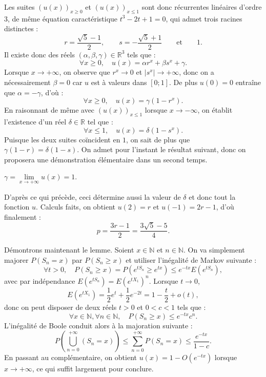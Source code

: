 Les suites $(u(x))_{x \geq 0}$ et $(u(x))_{x \leq 1}$ sont donc récurrentes linéaires d'ordre $3$, de même équation caractéristique
$t^3 - 2t + 1 = 0$, qui admet trois racines distinctes :
\[
r = \frac{\sqrt 5 - 1}{2},
\qquad
s = - \frac{\sqrt 5 + 1}{2}
\qquad\text{et}\qquad
1.
\]
Il existe donc des réels $(\alpha,\beta,\gamma) \in \mathbb R^3$ tels que :
$$
\forall x\geq 0,\quad
u(x) = \alpha r^x + \beta s^x + \gamma.
$$
Lorsque $x \to +\infty$, on observe que $r^x \to 0$ et $|s^x| \to +\infty$, donc on a nécessairement $\beta= 0$ car $u$ est à valeurs dans $[0;1]$. De plus $u(0) = 0$ entraîne que $\alpha = -\gamma$, d'où :
$$
\forall x\geq 0,\quad
u(x) = \gamma(1 - r^x).
$$
En raisonnant de même avec $(u(x))_{x \leq 1}$ lorsque $x \to -\infty$, on établit l'existence d'un réel $\delta \in \mathbb R$ tel que :
$$
\forall x \leq 1,\quad
u(x) = \delta(1-s^x).
$$
Puisque les deux suites coïncident en $1$, on sait de plus que $\gamma(1-r) = \delta (1-s).$
On admet pour l'instant le résultat suivant, donc on proposera une démonstration élémentaire dans un second temps.

\begin{lemme}
$\gamma = \lim\limits_{x\to +\infty} u(x) = 1$.
\end{lemme}

D'après ce qui précède, ceci détermine aussi la valeur de $\delta$ et donc tout la fonction $u$. Calculs faits, on obtient $u(2) = r$ et $u(-1) = 2r-1$, d'où finalement :
\[
{p = \dfrac{3r-1}{2} = \dfrac{3\sqrt 5 - 5}{4}}.
\]


Démontrons maintenant le lemme. Soient $x \in \mathbb N$ et $n \in \mathbb N$. On va simplement majorer $P(S_n = x)$ par $P(S_n \geq x)$ et utiliser l'inégalité de Markov suivante :
$$
\forall t > 0,\quad P(S_n \geq x) = P(e^{t S_n} \geq e^{tx}) \leq e^{-tx} E(e^{t S_n}),
$$
avec par indépendance $E(e^{tS_n}) = E(e^{tX_1})^n$. Lorsque $t \to 0$,
$$
E(e^{tX_1}) = \frac12 e^t + \frac12 e^{-2t} = 1 - \frac t2 + o(t),
$$
donc on peut disposer de deux réels $t > 0$ et $0 < c < 1$ tels que :
$$
\forall x\in \mathbb N,\forall n \in \mathbb N,\quad P(S_n \geq x) \leq e^{-tx} c^n.
$$
L'inégalité de Boole conduit alors à la majoration suivante :
$$
P\left(\bigcup_{n=0}^{+\infty} (S_n = x)\right) \leq \sum_{n=0}^{+\infty} P(S_n = x) \leq \frac{e^{-tx}}{1-c}.
$$
En passant au complémentaire, on obtient $u(x) = 1 -O(e^{-tx})$ lorsque $x \to +\infty$, ce qui suffit largement pour conclure.


